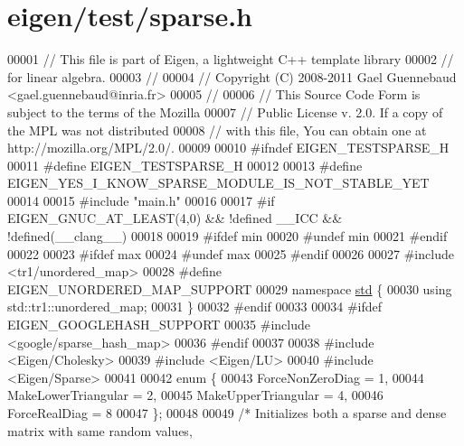 \hypertarget{eigen_2test_2sparse_8h_source}{}\section{eigen/test/sparse.h}
\label{eigen_2test_2sparse_8h_source}

\begin{DoxyCode}
00001 \textcolor{comment}{// This file is part of Eigen, a lightweight C++ template library}
00002 \textcolor{comment}{// for linear algebra.}
00003 \textcolor{comment}{//}
00004 \textcolor{comment}{// Copyright (C) 2008-2011 Gael Guennebaud <gael.guennebaud@inria.fr>}
00005 \textcolor{comment}{//}
00006 \textcolor{comment}{// This Source Code Form is subject to the terms of the Mozilla}
00007 \textcolor{comment}{// Public License v. 2.0. If a copy of the MPL was not distributed}
00008 \textcolor{comment}{// with this file, You can obtain one at http://mozilla.org/MPL/2.0/.}
00009 
00010 \textcolor{preprocessor}{#ifndef EIGEN\_TESTSPARSE\_H}
00011 \textcolor{preprocessor}{#define EIGEN\_TESTSPARSE\_H}
00012 
00013 \textcolor{preprocessor}{#define EIGEN\_YES\_I\_KNOW\_SPARSE\_MODULE\_IS\_NOT\_STABLE\_YET}
00014 
00015 \textcolor{preprocessor}{#include "main.h"}
00016 
00017 \textcolor{preprocessor}{#if EIGEN\_GNUC\_AT\_LEAST(4,0) && !defined \_\_ICC && !defined(\_\_clang\_\_)}
00018 
00019 \textcolor{preprocessor}{#ifdef min}
00020 \textcolor{preprocessor}{#undef min}
00021 \textcolor{preprocessor}{#endif}
00022 
00023 \textcolor{preprocessor}{#ifdef max}
00024 \textcolor{preprocessor}{#undef max}
00025 \textcolor{preprocessor}{#endif}
00026 
00027 \textcolor{preprocessor}{#include <tr1/unordered\_map>}
00028 \textcolor{preprocessor}{#define EIGEN\_UNORDERED\_MAP\_SUPPORT}
00029 \textcolor{keyword}{namespace }\hyperlink{namespacestd}{std} \{
00030   \textcolor{keyword}{using} std::tr1::unordered\_map;
00031 \}
00032 \textcolor{preprocessor}{#endif}
00033 
00034 \textcolor{preprocessor}{#ifdef EIGEN\_GOOGLEHASH\_SUPPORT}
00035 \textcolor{preprocessor}{  #include <google/sparse\_hash\_map>}
00036 \textcolor{preprocessor}{#endif}
00037 
00038 \textcolor{preprocessor}{#include <Eigen/Cholesky>}
00039 \textcolor{preprocessor}{#include <Eigen/LU>}
00040 \textcolor{preprocessor}{#include <Eigen/Sparse>}
00041 
00042 \textcolor{keyword}{enum} \{
00043   ForceNonZeroDiag = 1,
00044   MakeLowerTriangular = 2,
00045   MakeUpperTriangular = 4,
00046   ForceRealDiag = 8
00047 \};
00048 
00049 \textcolor{comment}{/* Initializes both a sparse and dense matrix with same random values,}

\end{DoxyCode}
